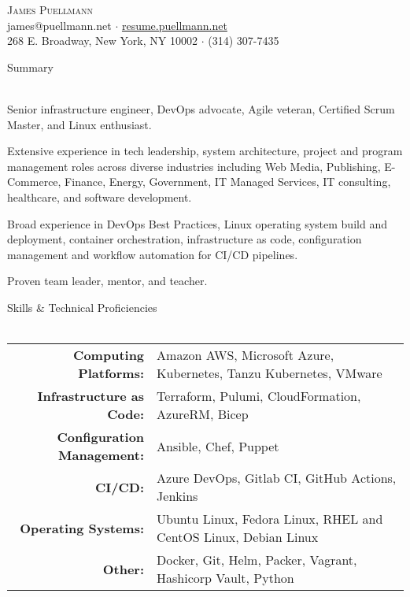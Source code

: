 \documentclass[letterpaper]{article}
\newcommand{\lineunder} {
    \vspace*{-8pt} \\
    \hspace*{-18pt} \hrulefill \\
}
\newcommand{\header} [1] {
    {\hspace*{-18pt}\vspace*{6pt} #1}
    \vspace*{-6pt} \lineunder
}
\begin{document}
\vspace*{-40pt}

    

\vspace*{-10pt}
\begin{center}
	{\Huge \scshape {James Puellmann}}\\
  james@puellmann.net $\cdot$ \href{http://resume.puellmann.net/resume.pdf}{resume.puellmann.net} \\
  268 E. Broadway, New York, NY 10002 $\cdot$ (314) 307-7435\\
\end{center}

\header{Summary}
\vspace{1mm}

Senior infrastructure engineer, DevOps advocate, Agile veteran, Certified Scrum
    Master, and Linux enthusiast.
\vspace{1.5mm}

Extensive experience in tech leadership, system architecture, project and
    program management roles across diverse industries including Web Media,
    Publishing, E-Commerce, Finance, Energy, Government, IT Managed Services,
    IT consulting, healthcare, and software development.
\vspace{1.5mm}

Broad experience in DevOps Best Practices, Linux operating system build and
    deployment, container orchestration, infrastructure as code, configuration
    management and workflow automation for CI/CD pipelines.
\vspace{1.5mm}

Proven team leader, mentor, and teacher.

\vspace{3mm}

\header{Skills \& Technical Proficiencies}
\begin{tabular}{ r l }
  \textbf{Computing Platforms:}      & Amazon AWS, Microsoft Azure, Kubernetes, Tanzu Kubernetes, VMware\\
  \textbf{Infrastructure as Code:}   & Terraform, Pulumi, CloudFormation, AzureRM, Bicep                \\
  \textbf{Configuration Management:} & Ansible, Chef, Puppet                                            \\
  \textbf{CI/CD:}                    & Azure DevOps, Gitlab CI, GitHub Actions, Jenkins                 \\
  \textbf{Operating Systems:}        & Ubuntu Linux, Fedora Linux, RHEL and CentOS Linux, Debian Linux  \\
  \textbf{Other:}                    & Docker, Git, Helm, Packer, Vagrant, Hashicorp Vault, Python      \\
\end{tabular}
\vspace{2mm}
\end{document}
